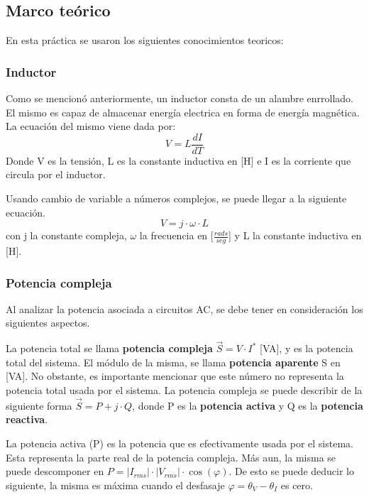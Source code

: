 \documentclass{article}
\begin{document}
        \subsection{Marco teórico}

        En esta práctica se usaron los siguientes conocimientos teoricos:

        \subsubsection{Inductor}

        Como se mencionó anteriormente, un inductor consta de un alambre enrrollado. El mismo es capaz de almacenar energía electrica en forma de energía magnética.
         La ecuación del mismo viene dada por:
        \begin{equation*}
            V=L \frac{dI}{dT}
        \end{equation*}
        Donde V es la tensión, L es la constante inductiva en [H] e I es la corriente que circula por el inductor.

        Usando cambio de variable a números complejos, se puede llegar a la siguiente ecuación.
        \begin{equation*}
            V=j\cdot \omega\cdot L
        \end{equation*}
        con j la constante compleja, $\omega$ la frecuencia en [$\frac{rads}{seg}$] y L la constante inductiva en [H].

        \subsubsection{Potencia compleja}

        Al analizar la potencia asociada a circuitos AC, se debe tener en consideración los siguientes aspectos.\par
        La potencia total se llama { \bfseries potencia compleja} $\vec{S}= V \cdot I^{*}$ [VA], y es la potencia total del sistema. El módulo de la misma, se llama {\bfseries potencia aparente} S en [VA]. No obstante, es importante mencionar que este número no representa la potencia total usada por el sistema.
        La potencia compleja se puede describir de la siguiente forma $\vec{S}=P + j \cdot Q$, donde P es la { \bfseries potencia activa} y Q es la {\bfseries potencia reactiva}. \par

        La potencia activa (P) es la potencia que es efectivamente usada por el sistema. Esta representa la parte real de la potencia compleja.
        Más aun, la misma se puede descomponer en $P= |I_{rms}| \cdot |V_{rms}| \cdot \cos (\varphi)$. De esto se puede deducir lo siguiente, la misma es máxima cuando el desfasaje $\varphi = \theta_{V} - \theta_I $ es cero. \par
\end{document}
